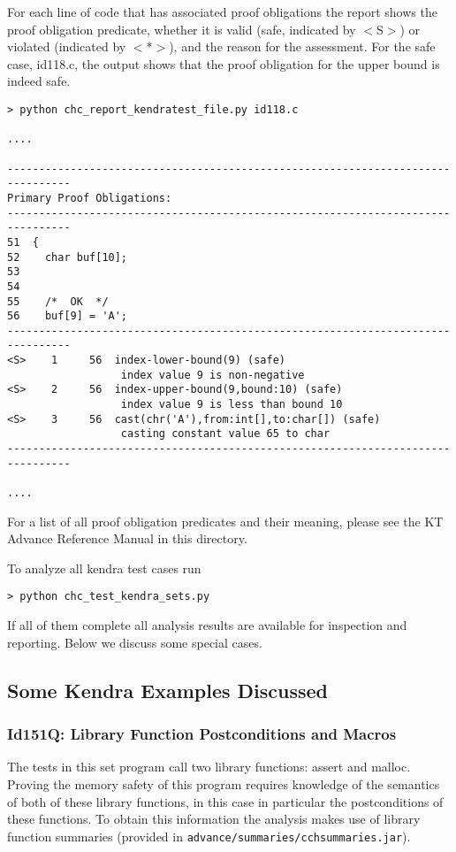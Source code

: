 \documentclass[11pt]{article}
\begin{document}
For each line of code that has associated proof obligations the report shows the
proof obligation predicate, whether it is valid (safe, indicated by $<$S$>$) or 
violated (indicated by $<$*$>$), and the reason for the assessment. For the safe
case, id118.c, the output shows that the proof obligation for the upper bound is
indeed safe.
\begin{small}
\begin{verbatim}
> python chc_report_kendratest_file.py id118.c

....

--------------------------------------------------------------------------------
Primary Proof Obligations:
--------------------------------------------------------------------------------
51  {
52    char buf[10];
53
54
55    /*  OK  */
56    buf[9] = 'A';
--------------------------------------------------------------------------------
<S>    1     56  index-lower-bound(9) (safe)
                  index value 9 is non-negative
<S>    2     56  index-upper-bound(9,bound:10) (safe)
                  index value 9 is less than bound 10
<S>    3     56  cast(chr('A'),from:int[],to:char[]) (safe)
                  casting constant value 65 to char
--------------------------------------------------------------------------------

....
\end{verbatim}
\end{small}




For a list of
all proof obligation predicates and their meaning, please see the KT Advance
Reference Manual in this directory.

To analyze all kendra test cases run
\begin{verbatim}
> python chc_test_kendra_sets.py
\end{verbatim}
If all of them complete all analysis results are available for inspection and reporting.
Below we discuss some special cases.

\subsection{Some Kendra Examples Discussed}

\subsubsection{Id151Q: Library Function Postconditions and Macros}

The tests in this set program call two library functions: assert and malloc. 
Proving the memory safety of this program requires knowledge of the semantics 
of both of these library functions, in this case in particular the postconditions 
of these functions. To obtain this information the analysis makes use of 
library function summaries (provided in {\tt advance/summaries/cchsummaries.jar}).
\end{document}
